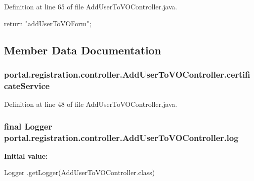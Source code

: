 Definition at line 65 of file AddUserToVOController.java.


\begin{DoxyCode}
                                                                {
                return "addUserToVOForm";
        }
\end{DoxyCode}


\subsection{Member Data Documentation}
\hypertarget{classportal_1_1registration_1_1controller_1_1AddUserToVOController_a2361af71b8bfdc3c7e61edbfda6bf0fa}{
\subsubsection[{certificateService}]{ {\bf portal.registration.controller.AddUserToVOController.certificateService}}}
\label{classportal_1_1registration_1_1controller_1_1AddUserToVOController_a2361af71b8bfdc3c7e61edbfda6bf0fa}


Definition at line 48 of file AddUserToVOController.java.

\hypertarget{classportal_1_1registration_1_1controller_1_1AddUserToVOController_a133f4ebcf54552effe4fbca418cb7e18}{
\subsubsection[{log}]{\setlength{\rightskip}{0pt plus 5cm}final Logger {\bf portal.registration.controller.AddUserToVOController.log}}}
\label{classportal_1_1registration_1_1controller_1_1AddUserToVOController_a133f4ebcf54552effe4fbca418cb7e18}
{\bfseries Initial value:}
\begin{DoxyCode}
 Logger
                        .getLogger(AddUserToVOController.class)
\end{DoxyCode}


